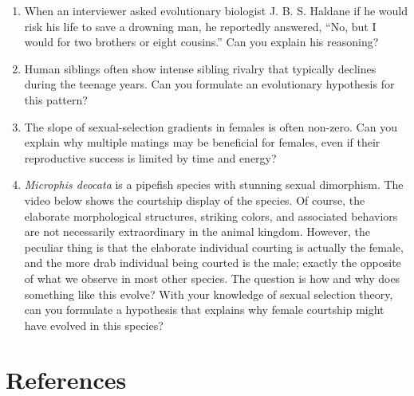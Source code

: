 \documentclass[
]{book}
\providecommand{\tightlist}{%
  \setlength{\itemsep}{0pt}\setlength{\parskip}{0pt}}
\begin{document}
\begin{enumerate}
\def\labelenumi{\arabic{enumi}.}
\tightlist
\item
  When an interviewer asked evolutionary biologist J. B. S. Haldane if he would risk his life to save a drowning man, he reportedly answered, ``No, but I would for two brothers or eight cousins.'' Can you explain his reasoning?
\item
  Human siblings often show intense sibling rivalry that typically declines during the teenage years. Can you formulate an evolutionary hypothesis for this pattern?
\item
  The slope of sexual-selection gradients in females is often non-zero. Can you explain why multiple matings may be beneficial for females, even if their reproductive success is limited by time and energy?
\item
  \emph{Microphis deocata} is a pipefish species with stunning sexual dimorphism. The video below shows the courtship display of the species. Of course, the elaborate morphological structures, striking colors, and associated behaviors are not necessarily extraordinary in the animal kingdom. However, the peculiar thing is that the elaborate individual courting is actually the female, and the more drab individual being courted is the male; exactly the opposite of what we observe in most other species. The question is how and why does something like this evolve? With your knowledge of sexual selection theory, can you formulate a hypothesis that explains why female courtship might have evolved in this species?
\end{enumerate}

\hypertarget{references-10}{%
\section{References}\label{references-10}}
\end{document}
